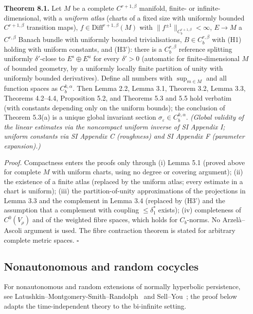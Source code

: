 \documentclass[11pt,a4paper]{article}
\theoremstyle{plain}
\theoremstyle{definition}
\theoremstyle{remark}
\numberwithin{equation}{section}
\numberwithin{figure}{section}
\begin{document}
\textbf{Theorem 8.1.} Let $M$ be a complete $C^{r+1,\beta}$ manifold, finite- or infinite-dimensional, with a \textit{uniform atlas} (charts of a fixed size with uniformly bounded $C^{r+1,\beta}$ transition maps), $f\in\mathrm{Diff}^{r+1,\beta}(M)$ with $\|f^{\pm1}\|_{C^{r+1,\beta}_b}<\infty$, $E\to M$ a $C^{r,\beta}$ Banach bundle with uniformly bounded trivialisations, $B\in C^{r,\beta}_b$ with (H1) holding with uniform constants, and (H3'): there is a $C^{r,\beta}_b$ reference splitting uniformly $\delta'$-close to $E^s\oplus E^u$ for every $\delta'>0$ (automatic for finite-dimensional $M$ of bounded geometry, by a uniformly locally finite partition of unity with uniformly bounded derivatives). Define all numbers with $\sup_{m\in M}$ and all function spaces as $C^{k,\alpha}_b$. Then Lemma 2.2, Lemma 3.1, Theorem 3.2, Lemma 3.3, Theorems 4.2–4.4, Proposition 5.2, and Theorems 5.3 and 5.5 hold verbatim (with constants depending only on the uniform bounds); the conclusion of Theorem 5.3(a) is a unique global invariant section $\sigma_\varepsilon\in C^{k,\alpha}_b$. \textit{(Global validity of the linear estimates via the noncompact uniform inverse of SI Appendix I; uniform constants via SI Appendix C (roughness) and SI Appendix F (parameter expansion).)}

\textit{Proof.} Compactness enters the proofs only through (i) Lemma 5.1 (proved above for complete $M$ with uniform charts, using no degree or covering argument); (ii) the existence of a finite atlas (replaced by the uniform atlas; every estimate in a chart is uniform); (iii) the partition-of-unity approximations of the projections in Lemma 3.3 and the complement in Lemma 3.4 (replaced by (H3') and the assumption that a complement with coupling $\le\delta_1^*$ exists); (iv) completeness of $C^0(V_\rho)$ and of the weighted fibre spaces, which holds for $C_b$-norms. No Arzelà–Ascoli argument is used. The fibre contraction theorem is stated for arbitrary complete metric spaces. $\square$

\subsection{Nonautonomous and random cocycles}

For nonautonomous and random extensions of normally hyperbolic persistence, see Latushkin–Montgomery-Smith–Randolph~\cite{lat1996} and Sell–You~\cite{sell2002}; the proof below adapts the time-independent theory to the bi-infinite setting.
\end{document}
